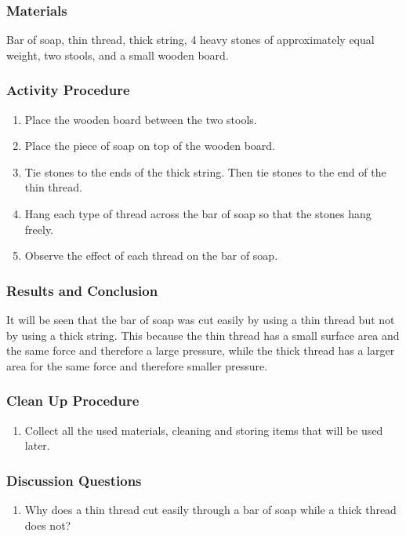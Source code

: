\subsubsection*{Materials}
Bar of soap, thin thread, thick string, 4 heavy stones of approximately equal weight, two stools, and a small wooden board.

\subsubsection*{Activity Procedure}
\begin{enumerate}
\item{Place the wooden board between the two stools.}
\item{Place the piece of soap on top of the wooden board. }
\item{Tie stones to the ends of the thick string. Then tie stones to the end of the thin thread.} 
\item{Hang each type of thread across the bar of soap so that the stones hang freely.} 
\item{Observe the effect of each thread on the bar of soap.} 
\end{enumerate}

\subsubsection*{Results and Conclusion}
It will be seen that the bar of soap was cut easily by using a thin thread but not by using a thick string. This because the thin thread has a small surface area and the same force and therefore a large pressure, while the thick thread has a larger area for the same force and therefore smaller pressure. 

\subsubsection*{Clean Up Procedure}
\begin{enumerate}
\item{Collect all the used materials, cleaning and storing items that will be used later.} 
\end{enumerate}

\subsubsection*{Discussion Questions}
\begin{enumerate}
\item{Why does a thin thread cut easily through a bar of soap while a thick thread does not?}
\end{enumerate}

